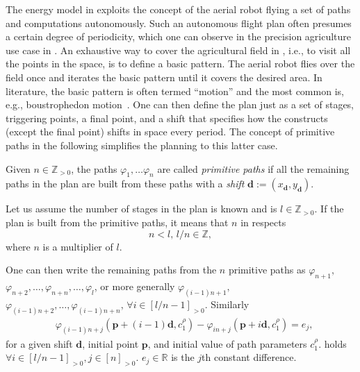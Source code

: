 The energy model in  exploits the concept of the aerial robot flying a set of paths and computations autonomously. Such an autonomous flight plan often presumes a certain degree of periodicity, which one can observe in the precision agriculture use case in . An exhaustive way to cover the agricultural field in , i.e., to visit all the points in the space, is to define a basic pattern. The aerial robot flies over the field once and iterates the basic pattern until it covers the desired area. In literature, the basic pattern is often termed ``motion'' and the most common is, e.g., boustrophedon motion~\citep{choset2005principles,choset2001coverage,cabreira2019survey,galceran2013survey}. One can then define the plan just as a set of stages, triggering points, a final point, and a shift that specifies how the constructs (except the final point) shifts in space every period. The concept of primitive paths in the following simplifies the planning to this latter case.

\begin{defn}
  \label{def:primitive}
  Given $n\in\mathbb{Z}_{>0}$, the paths $\varphi_1,\dots\varphi_n$ are called \emph{primitive paths} if all the remaining paths in the plan are built from these paths with a \emph{shift} $\mathbf{d}:=(x_{\mathbf{d}},y_{\mathbf{d}})$. 
\end{defn}

Let us assume the number of stages in the plan is known and is $l\in\mathbb{Z}_{>0}$. If the plan is built from the primitive paths, it means that $n$ in  respects
\begin{equation}
  n<l,\,l/n\in\mathbb{Z},
\end{equation}
where $n$ is a multiplier of $l$. 

One can then write the remaining paths from the $n$ primitive paths as $\varphi_{n+1},$ $\varphi_{n+2},\dots,\varphi_{n+n},\dots,\varphi_l$, or more generally $\varphi_{(i-1)n+1},$ $\varphi_{(i-1)n+2},\dots,\varphi_{(i-1)n+n},\,\forall i\in[l/n-1]_{>0}$. Similarly
\begin{equation}\label{eq:primitive}\begin{split}
  &\varphi_{(i-1)n+j}(\mathbf{p}+(i-1)\mathbf{d},c_1^\rho)-\varphi_{in+j}(\mathbf{p}+i\mathbf{d},c_1^\rho)=e_j,
\end{split}\end{equation}
for a given shift $\mathbf{d}$, initial point $\mathbf{p}$, and initial value of path parameters $c_1^\rho$.  holds $\forall i\in[l/n-1]_{>0},j\in[n]_{>0}$. $e_j\in\mathbb{R}$ is the $j$th constant difference.

